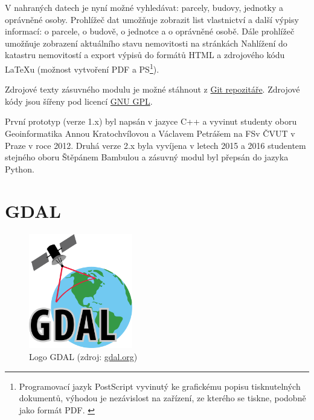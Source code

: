 V nahraných datech je nyní možné vyhledávat: parcely, budovy, jednotky
a oprávněné osoby. Prohlížeč dat umožňuje zobrazit list vlastnictví a
další výpisy informací: o parcele, o budově, o jednotce a o oprávněné
osobě. Dále prohlížeč umožňuje zobrazení aktuálního stavu nemovitosti
na stránkách Nahlížení do katastru nemovitostí a export výpisů do
formátů HTML a zdrojového kódu LaTeXu (možnost vytvoření PDF a
PS\footnote{Programovací jazyk PostScript vyvinutý ke grafickému
  popisu tisknutelných dokumentů, výhodou je nezávislost na zařízení,
  ze kterého se tiskne, podobně jako formát PDF. \cite{PostScript}}).

Zdrojové texty zásuvného modulu je možné stáhnout z
\href{https://github.com/ctu-geoforall-lab/qgis-vfk-plugin}{Git
  repozitáře}. Zdrojové kódy jsou šířeny pod licencí
\href{https://raw.githubusercontent.com/ctu-osgeorel/qgis-vfk-plugin/master/LICENSE}{GNU
  GPL}.

První prototyp (verze 1.x) byl napsán v jazyce C++ a vyvinut studenty
oboru Geoinformatika Annou Kratochvílovou a Václavem Petrášem na FSv
ČVUT v Praze v roce 2012. Druhá verze 2.x byla vyvíjena v letech 2015
a 2016 studentem stejného oboru Štěpánem Bambulou a zásuvný modul byl
přepsán do jazyka Python. \citep{vfk_qgis_plugin}
 
\section{GDAL}
\label{sec:gdal}
\begin{figure}[H]
	 \centering
      \includegraphics[height=5cm]{./pictures/gdal-logo.png}
      \caption{Logo GDAL (zdroj:
\href{https://upload.wikimedia.org/wikipedia/commons/thumb/d/df/GDALLogoColor.svg/572px-GDALLogoColor.svg.png}{gdal.org})}
      \label{fig:gdal}
  \end{figure}
  
